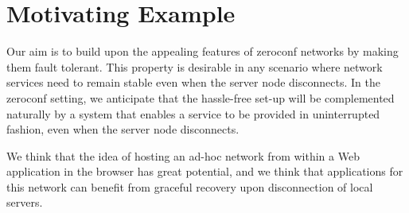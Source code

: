 \section{Motivating Example}
\label{sec:motivating_example}

Our aim is to build upon the appealing features of zeroconf networks by making them fault tolerant.
This property is desirable in any scenario where network services need to remain stable even when the server node disconnects.
In the zeroconf setting, we anticipate that the hassle-free set-up will be complemented naturally by a system that enables a service to be provided in uninterrupted fashion, even when the server node disconnects.

We think that the idea of hosting an ad-hoc network from within a Web application in the browser has great potential, and we think that applications for this network can benefit from graceful recovery upon disconnection of local servers.


